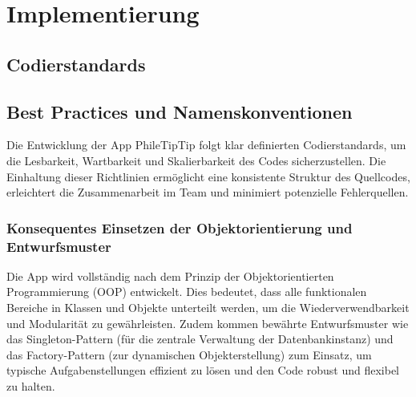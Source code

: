 \section{Implementierung}

\subsection{Codierstandards}
\subsection{Best Practices und Namenskonventionen}

Die Entwicklung der App PhileTipTip folgt klar definierten Codierstandards, um die Lesbarkeit, Wartbarkeit und Skalierbarkeit des Codes sicherzustellen. Die Einhaltung dieser Richtlinien ermöglicht eine konsistente Struktur des Quellcodes, erleichtert die Zusammenarbeit im Team und minimiert potenzielle Fehlerquellen.

\subsubsection{Konsequentes Einsetzen der Objektorientierung und Entwurfsmuster}
Die App wird vollständig nach dem Prinzip der Objektorientierten Programmierung (OOP) entwickelt. Dies bedeutet, dass alle funktionalen Bereiche in Klassen und Objekte unterteilt werden, um die Wiederverwendbarkeit und Modularität zu gewährleisten. Zudem kommen bewährte Entwurfsmuster wie das Singleton-Pattern (für die zentrale Verwaltung der Datenbankinstanz) und das Factory-Pattern (zur dynamischen Objekterstellung) zum Einsatz, um typische Aufgabenstellungen effizient zu lösen und den Code robust und flexibel zu halten.

